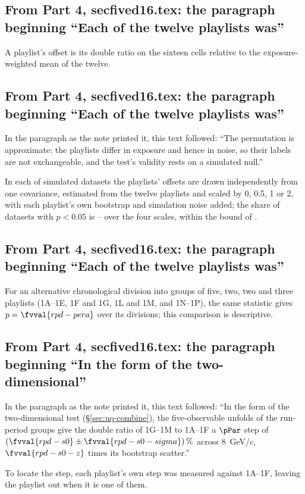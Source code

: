 \subsection{From Part 4, secfived16.tex: the paragraph beginning ``Each of the twelve playlists was''}
A playlist's offset is its double ratio on the sixteen cells relative to the exposure-weighted mean of the twelve.

\subsection{From Part 4, secfived16.tex: the paragraph beginning ``Each of the twelve playlists was''}
In the paragraph as the note printed it, this text followed: ``The permutation is approximate: the playlists differ in exposure and hence in noise, so their labels are not exchangeable, and the test's validity rests on a simulated null.''\par
In each of  simulated datasets the playlists' offsets are drawn independently from one covariance, estimated from the twelve playlists and scaled by 0, 0.5, 1 or 2, with each playlist's own bootstrap and simulation noise added; the share of datasets with $p<0.05$ is -- over the four scales, within the bound of .

\subsection{From Part 4, secfived16.tex: the paragraph beginning ``Each of the twelve playlists was''}
For an alternative chronological division into groups of five, two, two and three playlists (1A--1E, 1F and 1G, 1L and 1M, and 1N--1P), the same statistic gives $p=\fvval{rpd-pera}$ over its  divisions; this comparison is descriptive.

\subsection{From Part 4, secfived16.tex: the paragraph beginning ``In the form of the two-dimensional''}
In the paragraph as the note printed it, this text followed: ``In the form of the two-dimensional test (\S\ref{sec:uq-combine}), the five-observable unfolds of the run-period groups give the double ratio of 1G--1M to 1A--1F a $\pPar$ step of $(\fvval{rpd-s0}\pm\fvval{rpd-s0-sigma})\,\%$ across \SI{8}{GeV/c}, $\fvval{rpd-s0-z}$ times its bootstrap scatter.''\par
To locate the step, each playlist's own step was measured against 1A--1F, leaving the playlist out when it is one of them.

